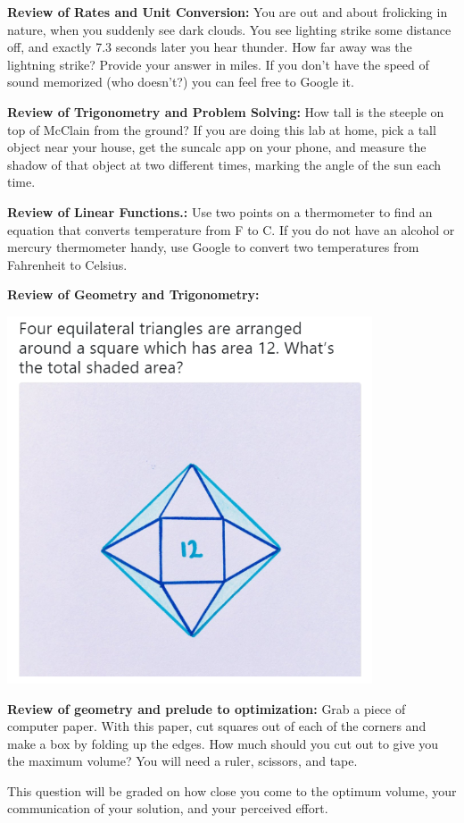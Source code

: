 \documentclass[11pt]{exam}
\begin{document}
	\begin{questions}
		
		\addpoints
		
		\question[5] \textbf{Review of Rates and Unit Conversion:}
		You are out and about frolicking in nature, when you suddenly see dark clouds. You see lighting strike some distance off, and exactly 7.3 seconds later you hear thunder. How far away was the lightning strike? Provide your answer in miles.   If you don't have the speed of sound memorized (who doesn't?) you can feel free to Google it.
		
		\question[5] \textbf{Review of Trigonometry and Problem Solving:}
		How tall is the steeple on top of McClain from the ground?  If you are doing this lab at home, pick a tall object near your house, get the suncalc app on your phone, and measure the shadow of that object at two different times, marking the angle of the sun each time.
		
		\question[5] \textbf{Review of Linear Functions.:}
		Use two points on a thermometer to find an equation that converts temperature from F to C.  If you do not have an alcohol or mercury thermometer handy, use Google to convert two temperatures from Fahrenheit to Celsius.
		
		\question[5] \textbf{Review of Geometry and Trigonometry:}
		
		\includegraphics[width=4 in]{images/geo.png}
		
		\newpage
		
		\question[5] \textbf{Review of geometry and prelude to optimization:}
		Grab a piece of computer paper. With this paper, cut squares out of each of the corners and make a box by folding up the edges. How much should you cut out to give you the maximum volume? You will need a ruler, scissors, and tape.
		
		This question will be graded on how close you come to the optimum volume, your communication of your solution, and your perceived effort.
		
		
		
		
	\end{questions}
	
\end{document}
